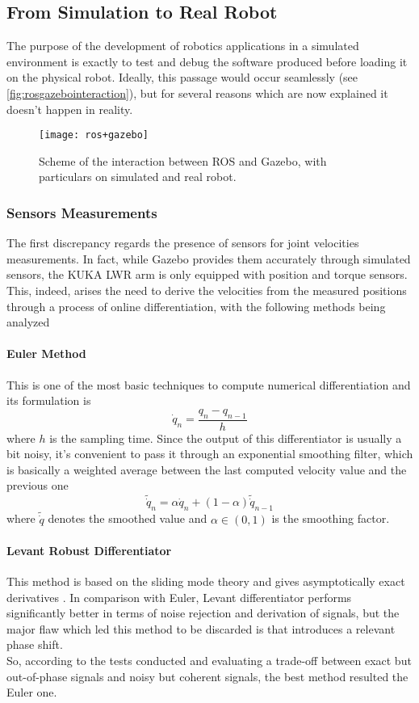 \subsection{From Simulation to Real Robot}
The purpose of the development of robotics applications in a simulated environment is exactly to test and debug the software produced before loading it on the physical robot. Ideally, this passage would occur seamlessly (see \autoref{fig:rosgazebointeraction}), but for several reasons which are now explained it doesn't happen in reality.
\begin{figure}[t]
\centerline{\texttt{[image: ros+gazebo]}}
\caption[Scheme of the interaction between ROS and Gazebo.]{Scheme of the interaction between ROS and Gazebo, with particulars on simulated and real robot.}
\label{fig:rosgazebointeraction}
\end{figure}
\subsubsection{Sensors Measurements}
The first discrepancy regards the presence of sensors for joint velocities measurements. In fact, while Gazebo provides them accurately through simulated sensors, the KUKA LWR arm is only equipped with position and torque sensors. This, indeed, arises the need to derive the velocities from the measured positions through a process of online differentiation, with the following methods being analyzed
\paragraph{Euler Method}
This is one of the most basic techniques to compute numerical differentiation and its formulation is
\begin{equation}
\dot{q}_n = \frac{q_n - q_{n-1}}{h}
\end{equation}
where $h$ is the sampling time. Since the output of this differentiator is usually a bit noisy, it's convenient to pass it through an exponential smoothing filter, which is basically a weighted average between the last computed velocity value and the previous one
\begin{equation}
\tilde{\dot{q}}_n = \alpha\dot{q}_n + (1-\alpha)\tilde{\dot{q}}_{n-1} 
\end{equation}
where $\tilde{\dot{q}}$ denotes the smoothed value and $\alpha\in(0,1)$ is the smoothing factor.
\paragraph{Levant Robust Differentiator}
This method is based on the sliding mode theory and gives asymptotically exact derivatives \cite{levant06}. In comparison with Euler, Levant differentiator performs significantly better in terms of noise rejection and derivation of signals, but the major flaw which led this method to be discarded is that introduces a relevant phase shift.\\[1em]
So, according to the tests conducted and evaluating a trade-off between exact but out-of-phase signals and noisy but coherent signals, the best method resulted the Euler one.
